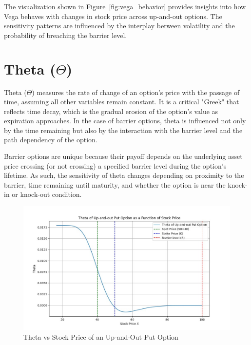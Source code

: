 The visualization shown in Figure~\ref{fig:vega_behavior} provides insights into how Vega behaves with changes in stock price across up-and-out options. The sensitivity patterns are influenced by the interplay between volatility and the probability of breaching the barrier level.

\section{Theta (\(\Theta\))}

Theta (\(\Theta\)) measures the rate of change of an option's price with the passage of time, assuming all other variables remain constant. It is a critical "Greek" that reflects time decay, which is the gradual erosion of the option's value as expiration approaches. In the case of barrier options, theta is influenced not only by the time remaining but also by the interaction with the barrier level and the path dependency of the option.

Barrier options are unique because their payoff depends on the underlying asset price crossing (or not crossing) a specified barrier level during the option's lifetime. As such, the sensitivity of theta changes depending on proximity to the barrier, time remaining until maturity, and whether the option is near the knock-in or knock-out condition.

\begin{figure}[H]
    \centering
    \includegraphics[width=.65\linewidth]{content/images/theta_upout.png}
    \caption{Theta vs Stock Price of an Up-and-Out Put Option}
    \label{fig:theta_behavior}
\end{figure}

